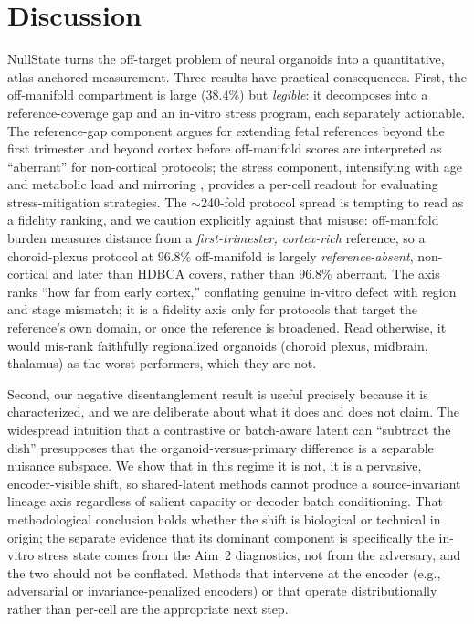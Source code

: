 \documentclass[11pt]{article}
\begin{document}
\section{Discussion}
NullState turns the off-target problem of neural organoids into a quantitative, atlas-anchored
measurement. Three results have practical consequences. First, the off-manifold compartment is large
($38.4\%$) but \emph{legible}: it decomposes into a reference-coverage gap and an in-vitro stress
program, each separately actionable. The reference-gap component argues for extending fetal references
beyond the first trimester and beyond cortex before off-manifold scores are interpreted as ``aberrant''
for non-cortical protocols; the stress component, intensifying with age and metabolic load and
mirroring \citet{bhaduri2020stress}, provides a per-cell readout for evaluating
stress-mitigation strategies. The $\sim$240-fold protocol spread is tempting to read as a fidelity
ranking, and we caution explicitly against that misuse: off-manifold burden measures distance from a
\emph{first-trimester, cortex-rich} reference, so a choroid-plexus protocol at $96.8\%$ off-manifold is
largely \emph{reference-absent}, non-cortical and later than HDBCA covers, rather than $96.8\%$
aberrant. The axis ranks ``how far from early cortex,'' conflating genuine in-vitro defect with region
and stage mismatch; it is a fidelity axis only for protocols that target the reference's own domain, or
once the reference is broadened. Read otherwise, it would mis-rank faithfully regionalized organoids
(choroid plexus, midbrain, thalamus) as the worst performers, which they are not.

Second, our negative disentanglement result is useful precisely because it is characterized, and we are
deliberate about what it does and does not claim. The widespread intuition that a contrastive or
batch-aware latent can ``subtract the dish'' presupposes that the organoid-versus-primary difference is a
separable nuisance subspace. We show that in this regime it is not, it is a pervasive, encoder-visible
shift, so shared-latent methods cannot produce a source-invariant lineage axis regardless of salient
capacity or decoder batch conditioning. That methodological conclusion holds whether the shift is
biological or technical in origin; the separate evidence that its dominant component is specifically the
in-vitro stress state comes from the Aim~2 diagnostics, not from the adversary, and the two should not be
conflated. Methods that intervene at the encoder (e.g., adversarial or invariance-penalized encoders) or
that operate distributionally rather than per-cell are the appropriate next step.
\end{document}
